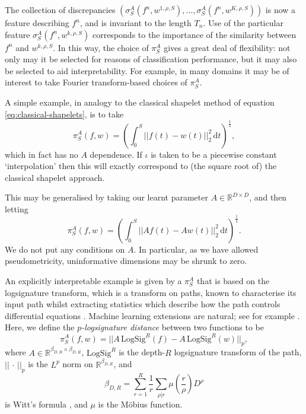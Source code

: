 \documentclass{article}
\theoremstyle{plain}
\theoremstyle{definition}
\newcommand{\reals}{\mathbb{R}}
\newcommand{\norm}[1]{\mathord|\!\mathord|#1\mathord|\!\mathord|} %
\newcommand{\dee}{\,\mathrm{d}}
\newcommand{\logsig}{\mathrm{LogSig}}
\begin{document}
	The collection of discrepancies $(\sigma^A_S(f^n, w^{1, \rho, S}), \ldots, \sigma^A_S(f^n, w^{K, \rho, S}))$ is now a feature describing $f^n$, and is invariant to the length $T_n$. Use of the particular feature $\sigma^A_S(f^n, w^{k, \rho, S})$ corresponds to the importance of the similarity between $f^n$ and $w^{k, \rho, S}$. In this way, the choice of $\pi^A_S$ gives a great deal of flexibility: not only may it be selected for reasons of classification performance, but it may also be selected to aid interpretability. For example, in many domains it may be of interest to take Fourier transform-based choices of $\pi^A_S$.
	
	A simple example, in analogy to the classical shapelet method of equation \eqref{eq:classical-shapelets}, is to take
	\begin{equation}\label{eq:learnt-discrepancy}
	\pi^A_S(f, w) = (\int_{0}^S \norm{f(t) - w(t)}_2^2 \dee t)^{\frac{1}{2}},
	\end{equation}
	which in fact has no $A$ dependence. If $\iota$ is taken to be a piecewise constant `interpolation' then this will exactly correspond to (the square root of) the classical shapelet approach.
	
	This may be generalised by taking our learnt parameter $A \in \reals^{D \times D}$, and then letting
	\begin{equation}\label{eq:logsignature-discrepancy}
	\pi^A_S(f, w) = (\int_{0}^S \norm{Af(t) - Aw(t)}_2^2 \dee t)^{\frac{1}{2}}.
	\end{equation}
	We do not put any conditions on $A$. In particular, as we have allowed pseudometricity, uninformative dimensions may be shrunk to zero.
	
	An explicitly interpretable example is given by a $\pi^A_S$ that is based on the logsignature transform, which is a transform on paths, known to characterise its input path whilst extracting statistics which describe how the path controls differential equations \cite{levy-lyons, TODO, TODO, TODO, TODO}. Machine learning extensions are natural; see for example \cite{toth2019, signature-kernel, deep-signatures, signatory, logsig-rnn}. Here, we define the \emph{$p$-logsignature distance} between two functions to be
	\begin{equation*}
	\pi^A_S(f, w) = \norm{A\,\logsig^R(f) - A\,\logsig^R(w)}_p,
	\end{equation*}
	where $A \in \reals^{\beta_{D, R} \times \beta_{D, R}}$, $\logsig^R$ is the depth-$R$ logsignature transform of the path, $\norm{\,\cdot\,}_p$ is the $L^p$ norm on $\reals^{\beta_{D, R}}$, and
	\begin{equation*}
	\beta_{D, R} = \sum_{r = 1}^R \frac{1}{r} \sum_{\rho \vert r} \mu\left(\frac{r}{\rho}\right) D^\rho
	\end{equation*}
	is Witt's formula \cite{witt}, and $\mu$ is the M{\"o}bius function.
\end{document}
